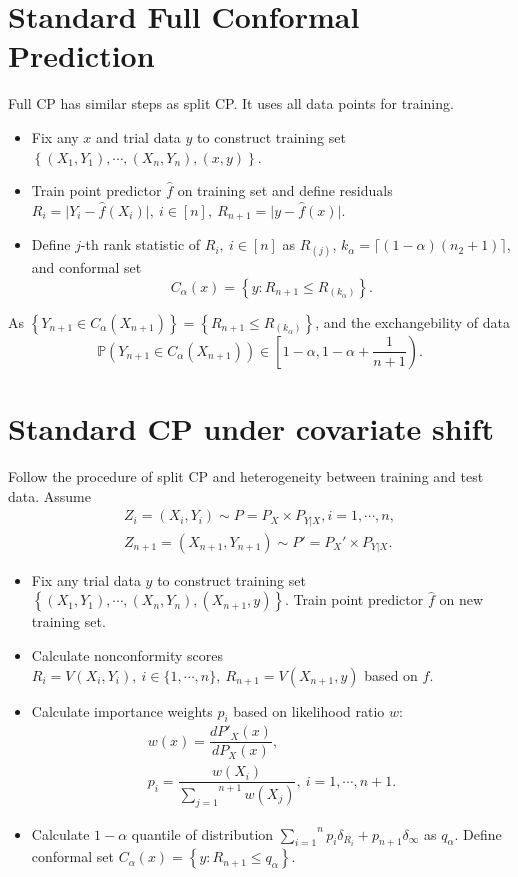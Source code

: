 \documentclass[12pt, a4paper, oneside]{article}
\begin{document}
\section{Standard Full Conformal Prediction}
    Full CP has similar steps as split CP. It uses all data points for training.
    \begin{itemize}
        \item Fix any $x$ and trial data $y$ to construct training set $\left\{ (X_1,Y_1),\cdots,(X_n,Y_n),(x,y) \right\}$.
        \item Train point predictor $\hat{f}$ on training set and define residuals $R_i=\Big|Y_i-\hat{f}(X_i)\Big|,\ i\in[n],\ R_{n+1}=\Big|y-\hat{f}(x)\Big|$.
        \item Define $j$-th rank statistic of $R_i,\ i\in[n]$ as $R_{(j)}$, $k_\alpha=\lceil (1-\alpha)(n_2+1)\rceil$, and conformal set
        \begin{equation*}
            C_\alpha(x)=\left\{ y:R_{n+1}\leq R_{(k_\alpha)} \right\}.
        \end{equation*}
    \end{itemize}
    As $\left\{ Y_{n+1}\in C_\alpha(X_{n+1}) \right\}=\left\{ R_{n+1}\leq R_{(k_\alpha)} \right\}$, and the exchangebility of data
    \begin{equation*}
        \mathbb{P}\left( Y_{n+1}\in C_\alpha(X_{n+1}) \right)\in\left[1-\alpha,1-\alpha+\dfrac{1}{n+1}\right).
    \end{equation*}


\section{Standard CP under covariate shift}
    Follow the procedure of split CP and heterogeneity between training and test data\cite{tibshirani2019conformal}. Assume
    \begin{gather*}
        Z_i=(X_i,Y_i)\sim P=P_X\times P_{Y|X},i=1,\cdots,n,\\
        Z_{n+1}=(X_{n+1},Y_{n+1})\sim P'=P_X'\times P_{Y|X}.
    \end{gather*}
    \begin{itemize}
        \item Fix any trial data $y$ to construct training set $\left\{ (X_1,Y_1),\cdots,(X_n,Y_n),(X_{n+1},y) \right\}$. Train point predictor $\hat{f}$ on new training set.
        \item Calculate nonconformity scores $R_i=V(X_i,Y_i),\ i\in\{1,\cdots,n\},\ R_{n+1}=V(X_{n+1},y)$ based on $\hat{f}$.
        \item Calculate importance weights $p_i$ based on likelihood ratio $w$:
        \begin{gather*}
            w(x)=\dfrac{dP'_X(x)}{dP_X(x)},\\
            p_i=\dfrac{w(X_i)}{\overset{n+1}{\underset{j=1}\sum}w(X_j)},\ i=1,\cdots,n+1.
        \end{gather*}
        \item Calculate $1-\alpha$ quantile of distribution $\overset{n}{\underset{i=1}\sum}p_i\delta_{R_i}+p_{n+1}\delta_{\infty}$ as $q_\alpha$. Define conformal set $C_\alpha(x)=\left\{ y:R_{n+1}\leq q_\alpha \right\}$.
    \end{itemize}
\end{document}
